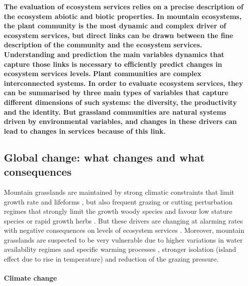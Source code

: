 %




\textbf{The evaluation of ecosystem services relies on a precise description of the ecosystem abiotic and biotic properties. In mountain ecosystems, the plant community is the most dynamic and complex driver of ecosystem services, but direct links can be drawn between the fine description of the community and the ecosystem services. Understanding and prediction the main variables dynamics that capture those links is necessary to efficiently predict changes in ecosystem services levels.}
\textbf{Plant communities are complex interconnected systems. In order to evaluate ecosystem services, they can be summarised by three main types of variables that capture different dimensions of such systems: the diversity, the productivity and the identity. But grassland communities are natural systems driven by environmental variables, and changes in these drivers can lead  to changes in services because of this link.}



\subsection{Global change: what changes and what consequences}

Mountain grasslands are maintained by strong climatic constraints that limit growth rate and lifeforms  \parencite{koorner_alpine_2003}, but also frequent grazing or cutting perturbation regimes that strongly limit the growth woody species and favour low stature species or rapid growth herbs \parencite{diaz_plant_2007}. But these drivers are changing at alarming rates with negative consequences on levels of ecosystem services \cite{schroter_ecosystem_2005}. Moreover, mountain grasslands are suspected to be very vulnerable \parencite{schroter_ecosystem_2005, engler_21st_2011} due to higher variations in water availability regimes and specific warming processes \parencite{mountain_research_initiative_edw_working_group_elevation-dependent_2015}, stronger isolation (island effect due to rise in temperature) and reduction of the grazing pressure.

\paragraph{Climate change}

